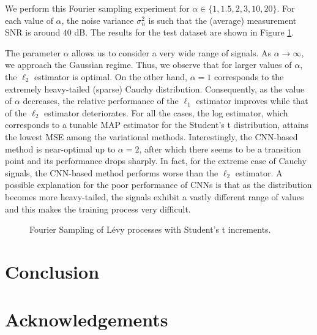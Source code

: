 \documentclass[journal]{IEEEtran}
\begin{document}
We perform this Fourier sampling experiment for $\alpha \in \{1, 1.5, 2, 3, 10, 20 \}$. For each value of $\alpha$, the noise variance $\sigma_n^{2}$ is such that the (average) measurement SNR is around $40$ dB. The results for the test dataset are shown in Figure \ref{fig:fourier_sampling_student}.

The parameter $\alpha$ allows us to consider a very wide range of signals. As $\alpha \rightarrow \infty$, we approach the Gaussian regime. Thus, we observe that for larger values of $\alpha$, the $\ell_2$ estimator is optimal. On the other hand, $\alpha=1$ corresponds to the extremely heavy-tailed (sparse) Cauchy distribution. Consequently, as the value of $\alpha$ decreases, the relative performance of the $\ell_1$ estimator improves while that of the $\ell_2$ estimator deteriorates. For all the cases, the log estimator, which corresponds to a tunable MAP estimator for the Student's t distribution, attains the lowest MSE among the variational methods. Interestingly, the CNN-based method is near-optimal up to $\alpha = 2$, after which there seems to be a transition point and its performance drops sharply. In fact, for the extreme case of Cauchy signals, the CNN-based method performs worse than the $\ell_2$ estimator. A possible explanation for the poor performance of CNNs is that as the distribution becomes more heavy-tailed, the signals exhibit a vastly different range of values and this makes the training process very difficult.

\begin{figure}[t]
    \centering
    
    \vspace{-10pt}
    \caption{Fourier Sampling of L\'{e}vy processes with Student's t increments.}
    \label{fig:fourier_sampling_student}
\end{figure}


\section{Conclusion}

    

\section{Acknowledgements}

    
\end{document}
